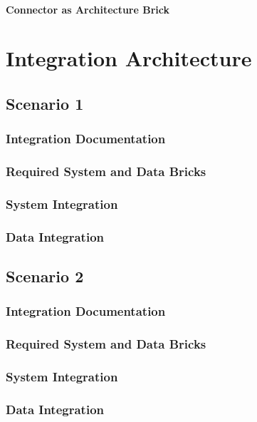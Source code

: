 \documentclass[
     12pt,         %
     a4paper,      %
     BCOR=10mm,version=first,     %
     DIV=14,version=first,        %
     ]{scrreprt}
\begin{document}
\subsubsection{Connector as Architecture Brick}


\chapter{Integration Architecture}

\section{Scenario 1}

\subsection{Integration Documentation}

\subsection{Required System and Data Bricks}

\subsection{System Integration}

\subsection{Data Integration}

\section{Scenario 2}

\subsection{Integration Documentation}

\subsection{Required System and Data Bricks}

\subsection{System Integration}

\subsection{Data Integration}
\end{document}
